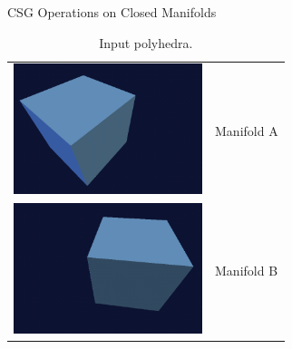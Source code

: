 \documentclass{carve}
\begin{document}
\begin{section}{CSG Operations on Closed Manifolds}
\begin{table}
  \begin{center}
    \begin{tabular}{m{2.2in}m{3in}}
      \includegraphics[width=2.167in]{ops/a.tiff} & \vfill Manifold A \vfill \\
      \includegraphics[width=2.167in]{ops/b.tiff} & Manifold B \\
    \end{tabular}
  \end{center}
  \caption{Input polyhedra.}
  \label{tab:input-polyhedra}
\end{table}


\end{section}
\end{document}
